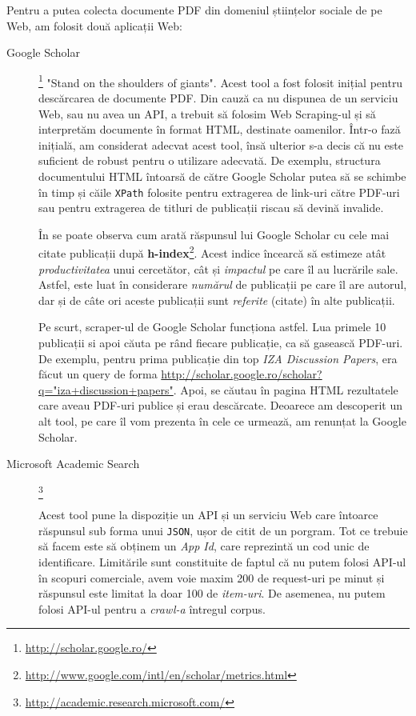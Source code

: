 Pentru a putea colecta documente PDF din domeniul științelor sociale de pe Web, am folosit două aplicații Web:
\begin{description}
\item[Google Scholar]\footnote{\url{http://scholar.google.ro/}} "Stand on the shoulders of giants". Acest tool a fost folosit inițial pentru descărcarea de documente PDF. Din cauză ca nu dispunea de un serviciu Web, sau nu avea un API, a trebuit să folosim Web Scraping-ul și să interpretăm documente în format HTML, destinate oamenilor. Într-o fază inițială, am considerat adecvat acest tool, însă ulterior s-a decis că nu este suficient de robust pentru o utilizare adecvată. De exemplu, structura documentului HTML întoarsă de către Google Scholar putea să se schimbe în timp și căile \texttt{XPath} folosite pentru extragerea de link-uri către PDF-uri sau pentru extragerea de titluri de publicații riscau să devină invalide.


În  se poate observa cum arată răspunsul lui Google Scholar cu cele mai citate publicații după \textbf{h-index}\footnote{\url{http://www.google.com/intl/en/scholar/metrics.html}}. Acest indice încearcă să estimeze atât \textit{productivitatea} unui cercetător, cât și \textit{impactul} pe care îl au lucrările sale. Astfel, este luat în considerare \textit{numărul} de publicații pe care îl are autorul, dar și de câte ori aceste publicații sunt \textit{referite} (citate) în alte publicații.


Pe scurt, scraper-ul de Google Scholar funcționa astfel. Lua primele 10 publicații si apoi căuta pe rând fiecare publicație, ca să gasească PDF-uri. De exemplu, pentru prima publicație din top \textit{IZA Discussion Papers}, era făcut un query de forma \url{http://scholar.google.ro/scholar?q="iza+discussion+papers"}. Apoi, se căutau în pagina HTML rezultatele care aveau PDF-uri publice și erau descărcate. Deoarece am descoperit un alt tool, pe care îl vom prezenta în cele ce urmează, am renunțat la Google Scholar.


\item [Microsoft Academic Search]\footnote{\url{http://academic.research.microsoft.com/}}

Acest tool pune la dispoziție un API și un serviciu Web care întoarce răspunsul sub forma unui \texttt{JSON}, ușor de citit de un porgram. Tot ce trebuie să facem este să obținem un \textit{App Id}, care reprezintă un cod unic de identificare. Limitările sunt constituite de faptul că nu putem folosi API-ul în scopuri comerciale, avem voie maxim 200 de request-uri pe minut și răspunsul este limitat la doar 100 de \textit{item-uri}. De asemenea, nu putem folosi API-ul pentru a \textit{crawl-a} întregul corpus.


\end{description}

